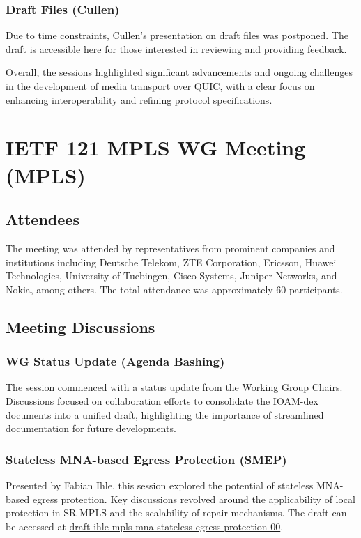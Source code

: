 \documentclass{article}
\begin{document}
\subsubsection{Draft Files (Cullen)}
Due to time constraints, Cullen's presentation on draft files was postponed. The draft is accessible \href{https://datatracker.ietf.org/doc/draft-jennings-moq-file/}{here} for those interested in reviewing and providing feedback.

Overall, the sessions highlighted significant advancements and ongoing challenges in the development of media transport over QUIC, with a clear focus on enhancing interoperability and refining protocol specifications.



\newpage

\section{IETF 121 MPLS WG Meeting (MPLS)}

\subsection{Attendees}
The meeting was attended by representatives from prominent companies and institutions including Deutsche Telekom, ZTE Corporation, Ericsson, Huawei Technologies, University of Tuebingen, Cisco Systems, Juniper Networks, and Nokia, among others. The total attendance was approximately 60 participants.

\subsection{Meeting Discussions}

\subsubsection{WG Status Update (Agenda Bashing)}
The session commenced with a status update from the Working Group Chairs. Discussions focused on collaboration efforts to consolidate the IOAM-dex documents into a unified draft, highlighting the importance of streamlined documentation for future developments.

\subsubsection{Stateless MNA-based Egress Protection (SMEP)}
Presented by Fabian Ihle, this session explored the potential of stateless MNA-based egress protection. Key discussions revolved around the applicability of local protection in SR-MPLS and the scalability of repair mechanisms. The draft can be accessed at \href{https://datatracker.ietf.org/doc/draft-ihle-mpls-mna-stateless-egress-protection-00}{draft-ihle-mpls-mna-stateless-egress-protection-00}.
\end{document}
